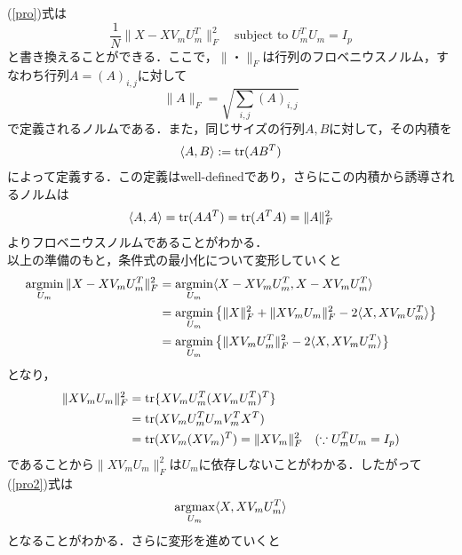 \documentclass{jsarticle}
\theoremstyle{definition}
\theoremstyle{mystyle} %
\newcommand{\argmax}{\mathop{\rm argmax}\limits}
\newcommand{\argmin}{\mathop{\rm argmin}\limits}
\begin{document}
(\ref{pro})式は
\begin{equation}
\tag*{(3)'} 
\label{pro2}
\frac{1}{N}\|X-XV_mU_m^T\|_F^2\quad \text{subject to}\;U_m^T U_m = I_p
\end{equation}
と書き換えることができる．ここで，$\|・\|_F$は行列のフロベニウスノルム，すなわち行列$A=(A)_{i,j}$に対して
$$\|A\|_F=\sqrt{\sum_{i,j}(A)_{i,j}}$$
で定義されるノルムである．また，同じサイズの行列$A,B$に対して，その内積を   
\begin{align*}
    \langle A,B  \rangle:= {\rm tr}(A B^T)
\end{align*}
によって定義する．この定義はwell-definedであり，さらにこの内積から誘導されるノルムは
\begin{align*}
   \langle A,A \rangle={\rm tr}(A A^T)={\rm tr}(A^T A)=\|A\|_F^2
\end{align*}
よりフロベニウスノルムであることがわかる．\\

以上の準備のもと，条件式の最小化について変形していくと
\begin{equation}
\begin{split}
\label{pro3}
\argmin_{U_m}\|X-XV_mU_m^T\|_F^2&=\argmin_{U_m}\langle X-XV_mU_m^T,X-XV_mU_m^T \rangle\\
&=\argmin_{U_m}\left\{\|X\|_F^2+\|XV_mU_m\|_F^2-2\langle X, XV_mU_m^T \rangle
\right\}\\
&=\argmin_{U_m}\left\{\|XV_mU_m^T\|_F^2-2\langle X, XV_mU_m^T \rangle
\right\}
\end{split}
\end{equation}
となり，
\begin{align*}
\|XV_mU_m\|_F^2&={\rm tr}\{XV_mU_m^T(XV_mU_m^T)^T\}\\
&={\rm tr}(XV_mU_m^TU_mV_m^TX^T)\\
&={\rm tr }(XV_m(XV_m)^T)=\|XV_m\|_F^2\quad (\because U_m^TU_m = I_p)
\end{align*}
であることから$\|XV_mU_m\|_F^2$は$U_m$に依存しないことがわかる．したがって(\ref{pro2})式は
\begin{align*}
\argmax_{U_m}\langle X, XV_mU_m^T \rangle
\end{align*}
となることがわかる．さらに変形を進めていくと
\end{document}
